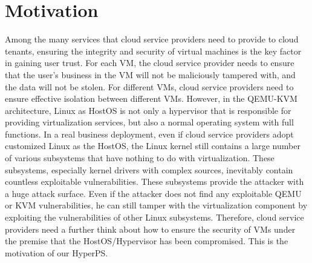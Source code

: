 \section{Motivation}%
\label{sec:motivation}
Among the many services that cloud service providers need to provide to cloud tenants, ensuring the integrity and security of virtual machines is the key factor in gaining user trust. For each VM, the cloud service provider needs to ensure that the user's business in the VM will not be maliciously tampered with, and the data will not be stolen. For different VMs, cloud service providers need to ensure effective isolation between different VMs. However, in the QEMU-KVM architecture, Linux as HostOS is not only a hypervisor that is responsible for providing virtualization services, but also a normal operating system with full functions. In a real business deployment, even if cloud service providers adopt customized Linux as the HostOS, the Linux kernel still contains a large number of various subsystems that have nothing to do with virtualization. These subsystems, especially kernel drivers with complex sources, inevitably contain countless exploitable vulnerabilities. These subsystems provide the attacker with a huge attack surface. Even if the attacker does not find any exploitable QEMU or KVM vulnerabilities, he can still tamper with the virtualization component by exploiting the vulnerabilities of other Linux subsystems. Therefore, cloud service providers need a further think about how to ensure the security of VMs under the premise that the HostOS/Hypervisor has been compromised. This is the motivation of our HyperPS.

